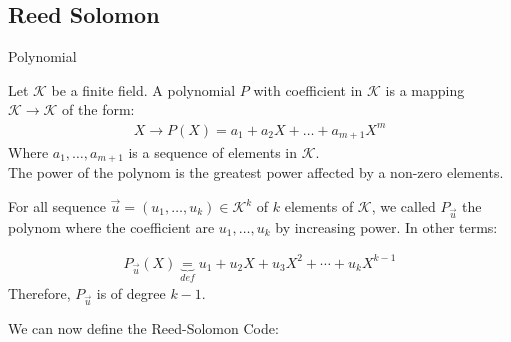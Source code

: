 \subsection{Reed Solomon}





\begin{parag}{Polynomial}
    
    \begin{definition}
        Let $\mathcal{K}$ be a finite field. A polynomial $P$ with coefficient in $\mathcal{K}$ is a mapping $\mathcal{K} \to \mathcal{K}$ of the form:
        \begin{align*} 
            X \to P\left(X\right) =  a_1 + a_2X + \ldots + a_{m+1} X^m
        \end{align*}
        Where $a_1, \ldots, a_{m+1}$ is a sequence of elements in $\mathcal{K}$.\\
        The power of the polynom is the greatest power affected by a non-zero elements.
    \end{definition}
    For all sequence $\vec{u} =  \left(u_1, \ldots, u_k\right) \in \mathcal{K}^k$ of $k$ elements of $\mathcal{K}$, we called $P_{\vec{u}}$ the polynom where the coefficient are $u_1, \ldots, u_k$ by increasing power. In other terms:
    \begin{definition}
    \begin{align*} 
        P_{\vec{u}}\left(X\right) \underbrace{= }_{def} u_1 + u_2X + u_3X^2 + \cdots + u_kX^{k-1}
    \end{align*}
    Therefore, $P_{\vec{u}}$ is of degree $k-1$. 
    \end{definition}
    We can now define the Reed-Solomon Code:
\end{parag}



